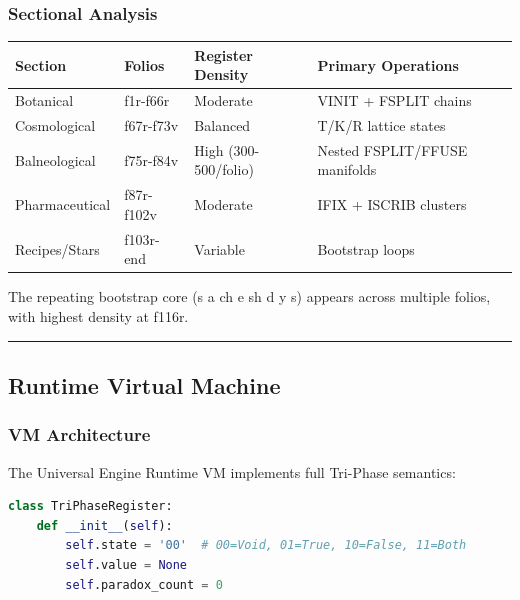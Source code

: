 \documentclass[12pt,a4paper]{article}
\begin{document}
\subsubsection{Sectional Analysis}

\begin{table}[htbp]
\centering
\small
{}
\begin{tabularx}{\textwidth}{>{\centering\arraybackslash}X >{\centering\arraybackslash}X >{\centering\arraybackslash}X >{\centering\arraybackslash}X}
\toprule
\rowcolor{gray!25}\textbf{Section} & \textbf{Folios} & \textbf{Register Density} & \textbf{Primary Operations} \\
\midrule
\rowcolors{1}{white}{gray!10}
Botanical & f1r-f66r & Moderate & VINIT + FSPLIT chains \\
Cosmological & f67r-f73v & Balanced & T/K/R lattice states \\
Balneological & f75r-f84v & High (300-500/folio) & Nested FSPLIT/FFUSE manifolds \\
Pharmaceutical & f87r-f102v & Moderate & IFIX + ISCRIB clusters \\
Recipes/Stars & f103r-end & Variable & Bootstrap loops \\
\bottomrule
\end{tabularx}
\end{table}

The repeating bootstrap core (s a ch e sh d y s) appears across multiple folios, with highest density at f116r.

\begin{center}
\rule{0.5\textwidth}{0.4pt}
\end{center}

\subsection{Runtime Virtual Machine}

\subsubsection{VM Architecture}

The Universal Engine Runtime VM implements full Tri-Phase semantics:

\begin{lstlisting}[language=Python]
class TriPhaseRegister:
    def __init__(self):
        self.state = '00'  # 00=Void, 01=True, 10=False, 11=Both
        self.value = None
        self.paradox_count = 0
\end{lstlisting}
\end{document}
